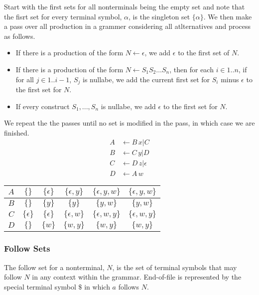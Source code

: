 Start with the first sets for all nonterminals being the empty set and note that the fisrt set for every terminal symbol, $\alpha$, is the singleton set $\{\alpha\}$.
We then make a pass over all production in a grammer considering all atlternatives and process as follows.
\begin{itemize}
    \item If there is a production of the form $N \leftarrow \epsilon$, we add $\epsilon$ to the first set of $N$.
    \item If there is a production of the form $N \leftarrow S_1 S_2 \dots S_n$, then for each $i \in 1..n$, if for all $j \in 1..i-1$, $S_j$ is nullabe, we add the current first set for $S_i$ minus $\epsilon$ to the first set for $N$.
    \item If every construct $S_1,...,S_n$ is nullabe, we add $\epsilon$ to the first set for $N$. 
\end{itemize}
We repeat the the passes until no set is modified in the pass, in which case we are finished.
\begin{align}
    A &\leftarrow B\,x | C\\
    B &\leftarrow C\,y | D\\
    C &\leftarrow D\,z | \epsilon\\
    D &\leftarrow A\,w
\end{align}
\begin{center}
\begin{tabular}{|c|c|c|c|c|c|}
    \hline
    $A$ & $\{\}$ & $\{\epsilon\}$ & $\{\epsilon,y\}$ &  $\{\epsilon,y,w\}$ &  $\{\epsilon,y,w\}$\\
    \hline
    $B$ & $\{\}$ & $\{y\}$ & $\{y\}$ &  $\{y,w\}$ &  $\{y,w\}$\\
    \hline
    $C$ & $\{\epsilon\}$ & $\{\epsilon\}$ & $\{\epsilon,w\}$ &  $\{\epsilon,w,y\}$ &  $\{\epsilon,w,y\}$\\
    \hline
    $D$ & $\{\}$ & $\{w\}$ & $\{w,y\}$ &  $\{w,y\}$ &  $\{w,y\}$\\
    \hline
\end{tabular}
\end{center}



\subsubsection{Follow Sets}
The follow set for a nonterminal, $N$, is the set of terminal symbols that may follow $N$ in any context within the grammar.
End-of-file is represented by the special terminal symbol $\$$ in which $a$ follows $N$.

